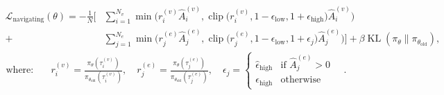 \begin{equation}\label{eq:navigating_loss}
\begin{aligned}
\mathcal{L}_{\text{navigating}}(\theta) = 
-\frac{1}{N} \Biggl[ &
\sum_{i=1}^{N_v} \min \Big( r_i^{(v)} \hat{A}_i^{(v)}, 
\operatorname{clip}\big( r_i^{(v)}, 1-\epsilon_{\text{low}}, 1+\epsilon_{\text{high}} \big) \hat{A}_i^{(v)} \Big) \\
+ & \sum_{j=1}^{N_e} \min \Big( r_j^{(e)} \hat{A}_j^{(e)}, 
\operatorname{clip}\big( r_j^{(e)}, 1-\epsilon_{\text{low}}, 1+\epsilon_j \big) \hat{A}_j^{(e)} \Big) 
\Biggr] 
+ \beta \operatorname{KL}\left( \pi_\theta \| \pi_{\theta_{\text{old}}} \right),
\end{aligned}
\end{equation}
\vspace{-0.2cm}
\begin{align*}
\text{where:} \quad 
& r_i^{(v)} = \frac{\pi_\theta(\tau_i^{(v)})}{\pi_{\theta_{\text{old}}}(\tau_i^{(v)})}, \quad 
r_j^{(e)} = \frac{\pi_\theta(\tau_j^{(e)})}{\pi_{\theta_{\text{old}}}(\tau_j^{(e)})}, \quad
\epsilon_j = 
\begin{cases} 
\hat{\epsilon}_{\text{high}} & \text{if } \hat{A}_j^{(e)} > 0 \\
\epsilon_{\text{high}} & \text{otherwise}
\end{cases} \quad.
\end{align*}
